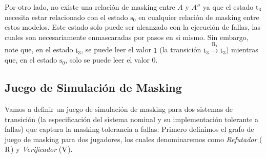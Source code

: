 \begin{exa}
Por otro lado, no existe una relación de masking entre $A$ y $A''$ ya que el estado $\text{t}_3$ necesita estar relacionado con el estado $\text{s}_0$ en cualquier relación de masking entre estos modelos. Este estado solo puede ser alcanzado con la ejecución de fallas, las cuales son necesariamente enmascaradas por pasos en si mismo. Sin embargo, note que, en el estado $\text{t}_3$, se puede leer el valor $1$ (la transición $\text{t}_3 \xrightarrow{\text{R}_1} \text{t}_3$) mientras que, en el estado $\text{s}_0$, solo se puede leer el valor $0$.
\end{exa}
 
\subsection{Juego de Simulación de Masking} \label{subsec:mask_sim_game}
	Vamos a definir un juego de simulación de masking para dos sistemas de transición (la especificación del sistema nominal y su implementación tolerante a fallas) que captura la masking-tolerancia a fallas. Primero definimos el grafo de juego de masking para dos jugadores, los cuales denominaremos como \emph{Refutador} ($\mathrm{R}$) y \emph{Verificador}
($\mathrm{V}$).

